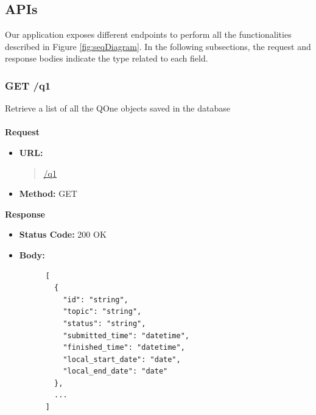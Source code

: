 \subsection{APIs}
Our application exposes different endpoints to perform all the functionalities described
in Figure \ref{fig:seqDiagram}. In the following subsections, the request and response bodies indicate
the type related to each field.

\subsubsection{GET /q1}
Retrieve a list of all the QOne objects saved in the database \\\\
\textbf{Request}
\begin{itemize}
  \item \textbf{URL:}
  \begin{quote}
    \url{/q1}
  \end{quote}
  \item \textbf{Method:} GET
\end{itemize}\leavevmode\newline
\textbf{Response}
\begin{itemize}
  \item \textbf{Status Code:} 200 OK
  \item \textbf{Body:}
    \begin{lstlisting}
      [
        {
          "id": "string",
          "topic": "string",
          "status": "string",
          "submitted_time": "datetime",
          "finished_time": "datetime",
          "local_start_date": "date",
          "local_end_date": "date"
        },
        ...
      ]
    \end{lstlisting}
\end{itemize}

